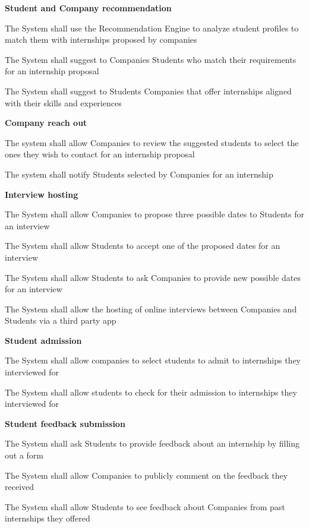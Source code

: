 \textbf{Student and Company recommendation}
\begin{enumerate}[label={[R\arabic{enumi}]}]
    \setcounter{enumi}{11}
    \item The System shall use the Recommendation Engine to analyze student profiles to match them with internships proposed by companies
    \item The System shall suggest to Companies Students who match their requirements for an internship proposal
    \item The System shall suggest to Students Companies that offer internships aligned with their skills and experiences
\end{enumerate}
\textbf{Company reach out}
\begin{enumerate}[label={[R\arabic{enumi}]}]
    \setcounter{enumi}{14}
    \item The system shall allow Companies to review the suggested students to select the ones they wish to contact for an internship proposal
    \item The system shall notify Students selected by Companies for an internship
\end{enumerate}
\textbf{Interview hosting}
\begin{enumerate}[label={[R\arabic{enumi}]}]
    \setcounter{enumi}{16}
    \item The System shall allow Companies to propose three possible dates to Students for an interview
    \item The System shall allow Students to accept one of the proposed dates for an interview
    \item The System shall allow Students to ask Companies to provide new possible dates for an interview
    \item The System shall allow the hosting of online interviews between Companies and Students via a third party app
\end{enumerate}
\textbf{Student admission}
\begin{enumerate}[label={[R\arabic{enumi}]}]
    \setcounter{enumi}{20}
    \item The System shall allow companies to select students to admit to internships they interviewed for
    \item The System shall allow students to check for their admission to internships they interviewed for
\end{enumerate}
\textbf{Student feedback submission}
\begin{enumerate}[label={[R\arabic{enumi}]}]
    \setcounter{enumi}{22}
    \item The System shall ask Students to provide feedback about an internship by filling out a form
    \item The System shall allow Companies to publicly comment on the feedback they received
    \item The System shall allow Students to see feedback about Companies from past internships they offered
\end{enumerate}
